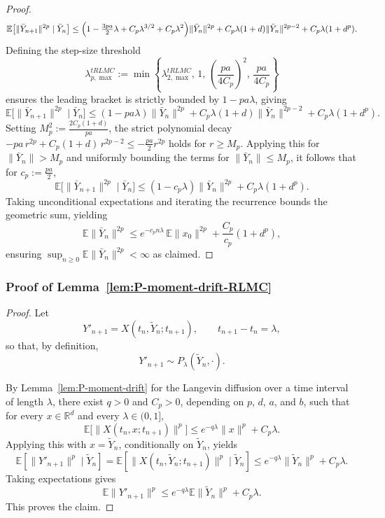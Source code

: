 \documentclass[11pt,a4paper,reqno]{amsart}
\theoremstyle{plain}
\theoremstyle{definition}
\theoremstyle{remark}
\newcommand{\E}{\mathbb{E}}
\begin{document}
\begin{proof}
\[
  \E\bigl[\|\bar Y_{n+1}\|^{2p}\mid\bar Y_n\bigr] \le \Bigl(1-\tfrac{3pa}{2}\lambda+C_p\lambda^{3/2}+C_p\lambda^2\Bigr)\|\bar Y_n\|^{2p} +C_p\lambda(1+d)\|\bar Y_n\|^{2p-2} +C_p\lambda(1+d^p).
\]
Defining the step-size threshold 
\[
\lambda_{p,\max}^{tRLMC} := \min\left\{\lambda_{2,\max}^{tRLMC},\,1,\,\left(\frac{pa}{4C_p}\right)^2,\,\frac{pa}{4C_p}\right\}
\]
ensures the leading bracket is strictly bounded by $1-pa\lambda$, giving
\[
  \E\bigl[\|\bar Y_{n+1}\|^{2p}\mid\bar Y_n\bigr] \le (1-pa\lambda)\|\bar Y_n\|^{2p} +C_p\lambda(1+d)\|\bar Y_n\|^{2p-2} +C_p\lambda(1+d^p).
\]
Setting $M_p^2:=\frac{2C_p(1+d)}{pa}$, the strict polynomial decay $-pa\,r^{2p}+C_p(1+d)\,r^{2p-2}\le-\tfrac{pa}{2}r^{2p}$ holds for $r\ge M_p$. Applying this for $\|\bar Y_n\| > M_p$ and uniformly bounding the terms for $\|\bar Y_n\| \le M_p$, it follows that for $c_p:=\frac{pa}{2}$,
\[
  \E\bigl[\|\bar Y_{n+1}\|^{2p}\mid\bar Y_n\bigr] \le (1-c_p\lambda)\|\bar Y_n\|^{2p}+C_p\lambda(1+d^p).
\]
Taking unconditional expectations and iterating the recurrence bounds the geometric sum, yielding
\[
  \E\|\bar Y_n\|^{2p} \le e^{-c_p n\lambda}\,\E\|x_0\|^{2p}+\frac{C_p}{c_p}(1+d^p),
\]
ensuring $\sup_{n\ge0}\E\|\bar Y_n\|^{2p}<\infty$ as claimed.
\end{proof}


\subsubsection{Proof of Lemma~\ref{lem:P-moment-drift-RLMC}}
\label{subsec:proof-P-moment-drift-RLMC}
\begin{proof}
Let
\[
Y'_{n+1}=X(t_n,\widetilde Y_n;t_{n+1}),
\qquad t_{n+1}-t_n=\lambda,
\]
so that, by definition,
\[
Y'_{n+1}\sim P_\lambda(\widetilde Y_n,\cdot).
\]

By Lemma~\ref{lem:P-moment-drift} for the Langevin diffusion
over a time interval of length \(\lambda\), there exist
\(q>0\) and \(C_p>0\), depending on \(p\), \(d\), \(a\), and \(b\), such that for every
\(x\in\mathbb R^d\) and every \(\lambda\in(0,1]\),
\[
\E\bigl[\|X(t_n,x;t_{n+1})\|^p\bigr]
\le
e^{-q\lambda}\|x\|^p + C_p\lambda .
\]
Applying this with \(x=\widetilde Y_n\), conditionally on
\(\widetilde Y_n\), yields
\[
\E\!\left[\|Y'_{n+1}\|^p \mid \widetilde Y_n\right]
=
\E\!\left[\|X(t_n,\widetilde Y_n;t_{n+1})\|^p \mid \widetilde Y_n\right]
\le
e^{-q\lambda}\|\widetilde Y_n\|^p + C_p\lambda .
\]
Taking expectations gives
\[
\E\|Y'_{n+1}\|^p
\le
e^{-q\lambda}\E\|\widetilde Y_n\|^p + C_p\lambda .
\]
This proves the claim.
\end{proof}
\end{document}
